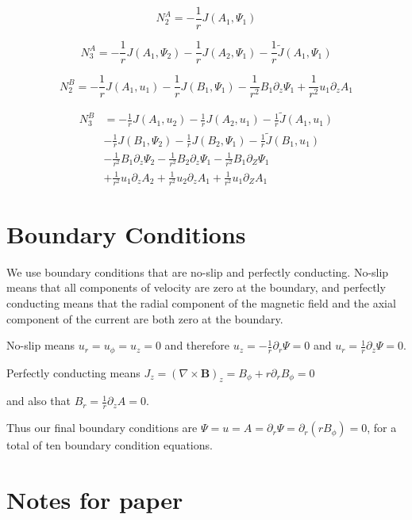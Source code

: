 \documentclass{paper}
\newcommand{\beq}{\begin{equation}}
\newcommand{\eeq}{\end{equation}}
\begin{document}
\beq
N_2^A = -\frac{1}{r} J\left(A_1, \Psi_1\right)
\eeq

\beq
N_3^A = -\frac{1}{r} J\left(A_1, \Psi_2\right) - \frac{1}{r}J\left(A_2, \Psi_1\right) - \frac{1}{r} \widetilde{J}\left(A_1, \Psi_1\right)
\eeq

\beq
N_2^B = -\frac{1}{r} J\left(A_1, u_1\right) - \frac{1}{r} J\left(B_1, \Psi_1\right) - \frac{1}{r^2} B_1 \partial_z \Psi_1 + \frac{1}{r^2} u_1 \partial_z A_1
\eeq

\beq
\begin{split}
N_3^B & = - \frac{1}{r} J\left(A_1, u_2\right) - \frac{1}{r} J\left(A_2, u_1\right) - \frac{1}{r}\widetilde{J}\left(A_1, u_1\right) \\
& - \frac{1}{r} J\left(B_1, \Psi_2\right) - \frac{1}{r} J\left(B_2, \Psi_1\right) - \frac{1}{r} \widetilde{J} \left(B_1, u_1\right) \\
& - \frac{1}{r^2} B_1\partial_z \Psi_2 - \frac{1}{r^2} B_2 \partial_z \Psi_1 - \frac{1}{r^2} B_1 \partial_Z \Psi_1 \\
& + \frac{1}{r^2} u_1 \partial_z A_2 + \frac{1}{r^2} u_2 \partial_z A_1 + \frac{1}{r^2} u_1 \partial_Z A_1
\end{split}
\eeq

\section{Boundary Conditions}

We use boundary conditions that are no-slip and perfectly conducting. No-slip means that all components of velocity are zero at the boundary, and perfectly conducting means that the radial component of the magnetic field and the axial component of the current are both zero at the boundary. 

No-slip means $u_r = u_\phi = u_z = 0$ and therefore $u_z = - \frac{1}{r}\partial_r \Psi = 0$ and $u_r = \frac{1}{r}\partial_z \Psi = 0$. 

Perfectly conducting means $J_z = (\nabla \times \mathbf{B})_z = B_\phi + r\partial_r B_\phi = 0$

and also that $B_r = \frac{1}{r}\partial_z A = 0$.

Thus our final boundary conditions are $\Psi = u = A = \partial_r \Psi = \partial_r(r B_\phi) = 0$, for a total of ten boundary condition equations.

\section{Notes for paper}
\end{document}
